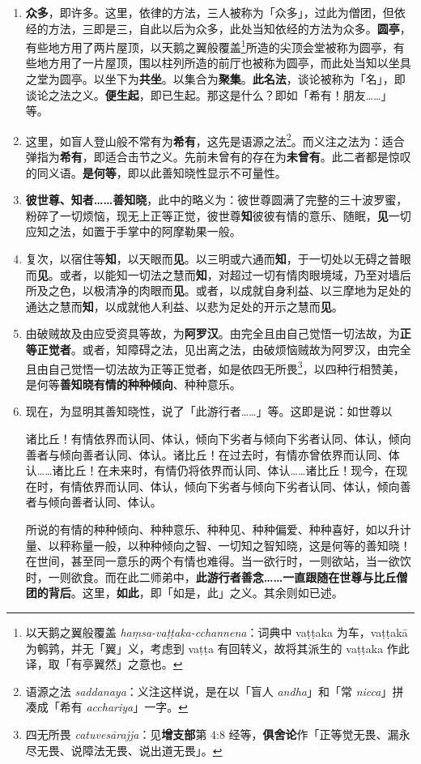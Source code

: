 \begin{enumerate}\item \textbf{众多}，即许多。这里，依律的方法，三人被称为「众多」，过此为僧团，但依经的方法，三即是三，自此以后为众多，此处当知依经的方法为众多。\textbf{圆亭}，有些地方用了两片屋顶，以天鹅之翼般覆盖\footnote{以天鹅之翼般覆盖 \textit{haṃsa-vaṭṭaka-cchannena}：词典中 vaṭṭaka 为车，vaṭṭakā 为鹌鹑，并无「翼」义，考虑到 vaṭṭa 有回转义，故将其派生的 vaṭṭaka 作此译，取「有亭翼然」之意也。}所造的尖顶会堂被称为圆亭，有些地方用了一片屋顶，围以柱列所造的前厅也被称为圆亭，而此处当知以坐具之堂为圆亭。以坐下为\textbf{共坐}。以集合为\textbf{聚集}。\textbf{此名法}，谈论被称为「名」，即谈论之法之义。\textbf{便生起}，即已生起。那这是什么？即如「希有！朋友……」等。
\item 这里，如盲人登山般不常有为\textbf{希有}，这先是语源之法\footnote{语源之法 \textit{saddanaya}：义注这样说，是在以「盲人 \textit{andha}」和「常 \textit{nicca}」拼凑成「希有 \textit{acchariya}」一字。}。而义注之法为：适合弹指为\textbf{希有}，即适合击节之义。先前未曾有的存在为\textbf{未曾有}。此二者都是惊叹的同义语。\textbf{是何等}，即以此善知晓性显示不可量性。
\item \textbf{彼世尊、知者……善知晓}，此中的略义为：彼世尊圆满了完整的三十波罗蜜，粉碎了一切烦恼，现无上正等正觉，彼世尊\textbf{知}彼彼有情的意乐、随眠，\textbf{见}一切应知之法，如置于手掌中的阿摩勒果一般。
\item 复次，以宿住等\textbf{知}，以天眼而\textbf{见}。以三明或六通而\textbf{知}，于一切处以无碍之普眼而\textbf{见}。或者，以能知一切法之慧而\textbf{知}，对超过一切有情肉眼境域，乃至对墙后所及之色，以极清净的肉眼而\textbf{见}。或者，以成就自身利益、以三摩地为足处的通达之慧而\textbf{知}，以成就他人利益、以悲为足处的开示之慧而\textbf{见}。
\item 由破贼故及由应受资具等故，为\textbf{阿罗汉}。由完全且由自己觉悟一切法故，为\textbf{正等正觉者}。或者，知障碍之法，见出离之法，由破烦恼贼故为阿罗汉，由完全且由自己觉悟一切法故为正等正觉者，如是依四无所畏\footnote{四无所畏 \textit{catuvesārajja}：见\textbf{增支部}第 4:8 经等，\textbf{俱舍论}作「正等觉无畏、漏永尽无畏、说障法无畏、说出道无畏」。}，以四种行相赞美，是何等\textbf{善知晓有情的种种倾向}、种种意乐。
\item 现在，为显明其善知晓性，说了「此游行者……」等。这即是说：如世尊以\begin{quoting}诸比丘！有情依界而认同、体认，倾向下劣者与倾向下劣者认同、体认，倾向善者与倾向善者认同、体认。诸比丘！在过去时，有情亦曾依界而认同、体认……诸比丘！在未来时，有情仍将依界而认同、体认……诸比丘！现今，在现在时，有情依界而认同、体认，倾向下劣者与倾向下劣者认同、体认，倾向善者与倾向善者认同、体认。\end{quoting}所说的有情的种种倾向、种种意乐、种种见、种种偏爱、种种喜好，如以升计量、以秤称量一般，以种种倾向之智、一切知之智知晓，这是何等的善知晓！在世间，甚至同一意乐的两个有情也难得。当一欲行时，一则欲站，当一欲饮时，一则欲食。而在此二师弟中，\textbf{此游行者善念……一直跟随在世尊与比丘僧团的背后}。这里，\textbf{如此}，即「如是，此」之义。其余则如已述。\end{enumerate}

